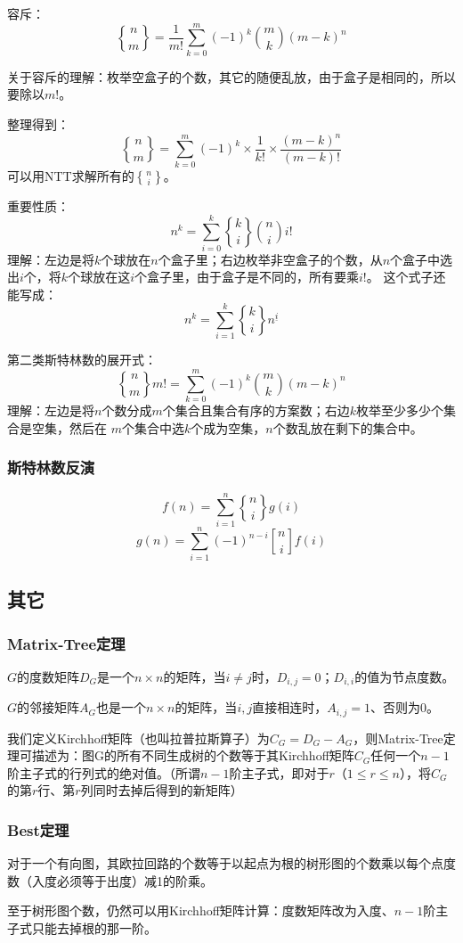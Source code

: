 \documentclass[twocolumn,a4]{article}
\begin{document}
容斥：$${n \brace m} = \frac{1}{m!} \sum_{k=0}^m (-1)^k \binom{m}{k} (m-k)^n$$

关于容斥的理解：枚举空盒子的个数，其它的随便乱放，由于盒子是相同的，所以要除以$m!$。

整理得到：
$$
{n \brace m} = \sum_{k=0}^m (-1)^k \times \frac{1}{k!} \times \frac{(m-k)^n}{(m-k)!}
$$
可以用NTT求解所有的${n\brace i}$。

重要性质：
$$
n^k = \sum_{i=0}^k {k \brace i} \binom{n}{i} i!
$$
理解：左边是将$k$个球放在$n$个盒子里；右边枚举非空盒子的个数，从$n$个盒子中选出$i$个，将$k$个球放在这$i$个盒子里，由于盒子是不同的，所有要乘$i!$。
这个式子还能写成：
$$
n^k = \sum_{i=1}^k {k \brace i} n^{\underline{i}}
$$

第二类斯特林数的展开式：
$$
{n \brace m} m! = \sum_{k=0}^m (-1)^k \binom{m}{k} (m-k)^n
$$
理解：左边是将$n$个数分成$m$个集合且集合有序的方案数；右边$k$枚举至少多少个集合是空集，然后在 $m$个集合中选$k$个成为空集，$n$个数乱放在剩下的集合中。
\subsubsection{斯特林数反演}
$$
f(n) = \sum_{i=1}^n {n \brace i} g(i)
$$
$$
g(n) = \sum_{i=1}^n (-1)^{n-i} {n \brack i} f(i)
$$
\subsection{其它}
\subsubsection{Matrix-Tree定理}
$G$的度数矩阵$D_G$是一个$n\times n$的矩阵，当$i\not = j$时，$D_{i,j} = 0$；$D_{i,i}$的值为节点度数。

$G$的邻接矩阵$A_G$也是一个$n\times n$的矩阵，当$i,j$直接相连时，$A_{i,j}=1$、否则为$0$。

我们定义Kirchhoff矩阵（也叫拉普拉斯算子）为$C_G = D_G - A_G$，则Matrix-Tree定理可描述为：图G的所有不同生成树的个数等于其Kirchhoff矩阵$C_G$任何一个$n-1$阶主子式的行列式的绝对值。（所谓$n-1$阶主子式，即对于$r$（$1\le r\le n$），将$C_G$的第$r$行、第$r$列同时去掉后得到的新矩阵）
\subsubsection{Best定理}
对于一个有向图，其欧拉回路的个数等于以起点为根的树形图的个数乘以每个点度数（入度必须等于出度）减1的阶乘。

至于树形图个数，仍然可以用Kirchhoff矩阵计算：度数矩阵改为入度、$n-1$阶主子式只能去掉根的那一阶。
\end{document}
